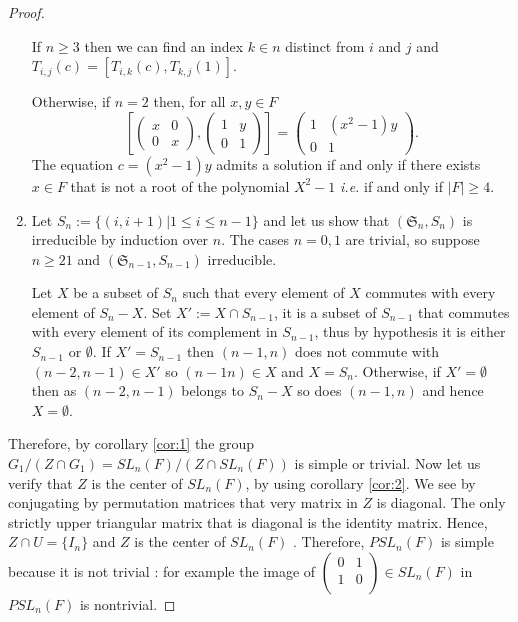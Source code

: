 \begin{proof}
\begin{enumerate}
            If $n\ge 3$ then we can find an index $k \in n$ distinct from $i$ and $j$ and $T_{i,j}\left( c \right)= [T_{i,k}(c), T_{k,j}(1)]$.

            Otherwise, if $n=2$ then, for all $x, y \in F$
    $$\left[ \begin{pmatrix} x & 0 \\ 0 & x \end{pmatrix}, \begin{pmatrix} 1 & y \\ 0 &1 \end{pmatrix} \right] = \begin{pmatrix} 1 & (x^2-1) y \\ 0 & 1 \end{pmatrix}.$$
    The equation $c = \left( x^2 -1  \right) y$ admits a solution if and only if there exists $x\in F$ that is not a root of the polynomial $X^2-1$ \textit{i.e.} if and only if $|F| \ge 4$.

        \item Let $S_n := \{(i,i+1) | 1\le i\le n-1\}$ and let us show that $\left( \mathfrak{S}_n,S_n \right)$ is irreducible by induction over $n$.
            The cases $n=0,1$ are trivial, so suppose $n\ge21$ and $\left( \mathfrak{S}_{n-1}, S_{n-1} \right)$ irreducible.

            Let $X$ be a subset of $S_n$ such that every element of $X$ commutes with every element of $S_n -X$. Set $X' := X \cap S_{n-1}$, it is a subset of $S_{n-1}$ that commutes with every element of its complement in $S_{n-1}$, thus by hypothesis it is either $S_{n-1}$ or $\emptyset$. If $X' = S_{n-1}$ then $\left( n-1,n \right)$ does not commute with $(n-2,n-1) \in X'$ so $\left( n-1n \right)\in X$ and $X = S_n$. Otherwise, if $X' = \emptyset$ then as $\left( n-2,n-1 \right)$ belongs to $S_n -X$ so does $\left( n-1,n \right)$ and hence $X=\emptyset$.
    \end{enumerate}

    Therefore, by corollary \ref{cor:1} the group $G_1 / (Z \cap G_1) = SL_n(F) / \left( Z \cap SL_n\left( F \right) \right)$ is simple or trivial.
    Now let us verify that $Z$ is the center of $SL_n\left( F \right)$, by using corollary \ref{cor:2}. We see by conjugating by permutation matrices that very matrix in $Z$ is diagonal. The only strictly upper triangular matrix that is diagonal is the identity matrix. Hence, $Z \cap U = \{I_n\}$ and $Z$ is the center of $SL_n\left( F \right)$ . Therefore, $PSL_n\left( F \right)$ is simple because it is not trivial : for example the image of $\left( \begin{smallmatrix}
            0 & 1 \\ 1 & 0\\
    \end{smallmatrix}
     \right) \in SL_n\left( F \right)$ in $PSL_n(F)$ is nontrivial.
\end{proof} 

